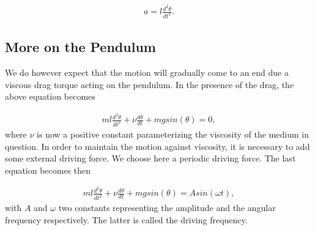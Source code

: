 \documentclass[letterpaper,10pt,english]{sphinxmanual}
\begin{document}
\begin{equation*}
\begin{split}
\begin{equation}
     a=l\frac{d^2\theta}{dt^2}.
\label{_auto21} \tag{22}
\end{equation}
\end{split}
\end{equation*}

\subsection{More on the Pendulum}
\label{\detokenize{chapter2:more-on-the-pendulum}}
We do however expect that the motion will gradually come to an end due a viscous drag torque acting on the pendulum.
In the presence of the drag, the above equation becomes




\begin{equation*}
\begin{split}
\begin{equation}
   ml\frac{d^2\theta}{dt^2}+\nu\frac{d\theta}{dt}  +mgsin(\theta)=0, \label{eq:pend1} \tag{23}
\end{equation}
\end{split}
\end{equation*}
where \(\nu\) is now a positive constant parameterizing the viscosity
of the medium in question. In order to maintain the motion against
viscosity, it is necessary to add some external driving force.
We choose here a periodic driving force. The last equation becomes then




\begin{equation*}
\begin{split}
\begin{equation}
   ml\frac{d^2\theta}{dt^2}+\nu\frac{d\theta}{dt}  +mgsin(\theta)=Asin(\omega t), \label{eq:pend2} \tag{24}
\end{equation}
\end{split}
\end{equation*}
with \(A\) and \(\omega\) two constants representing the amplitude and
the angular frequency respectively. The latter is called the driving frequency.
\end{document}
